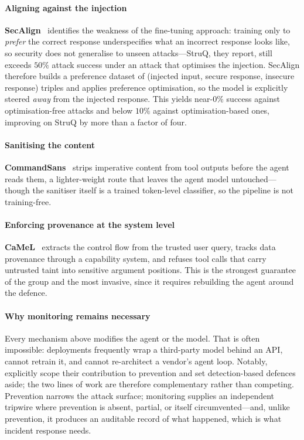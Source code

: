 \documentclass[preprint,12pt,authoryear]{elsarticle}
\theoremstyle{definition}
\begin{document}
\paragraph{Aligning against the injection}
\textbf{SecAlign}~\citep{chen2025secalign} identifies the weakness of the
fine-tuning approach: training only to \emph{prefer} the correct response
underspecifies what an incorrect response looks like, so security does not
generalise to unseen attacks---StruQ, they report, still exceeds $50\%$ attack
success under an attack that optimises the injection. SecAlign therefore builds a
preference dataset of (injected input, secure response, insecure response) triples
and applies preference optimisation, so the model is explicitly steered
\emph{away} from the injected response. This yields near-$0\%$ success against
optimisation-free attacks and below $10\%$ against optimisation-based ones,
improving on StruQ by more than a factor of four.

\paragraph{Sanitising the content}
\textbf{CommandSans}~\citep{das2025commandsans} strips imperative content from
tool outputs before the agent reads them, a lighter-weight route that leaves the
agent model untouched---though the sanitiser itself is a trained token-level
classifier, so the pipeline is not training-free.

\paragraph{Enforcing provenance at the system level}
\textbf{CaMeL}~\citep{debenedetti2025camel} extracts the control flow from the
trusted user query, tracks data provenance through a capability system, and
refuses tool calls that carry untrusted taint into sensitive argument positions.
This is the strongest guarantee of the group and the most invasive, since it
requires rebuilding the agent around the defence.

\paragraph{Why monitoring remains necessary}
Every mechanism above modifies the agent or the model. That is often impossible:
deployments frequently wrap a third-party model behind an API, cannot retrain it,
and cannot re-architect a vendor's agent loop. Notably, \citet{chen2025secalign}
explicitly scope their contribution to prevention and set detection-based defences
aside; the two lines of work are therefore complementary rather than competing.
Prevention narrows the attack surface; monitoring supplies an independent tripwire
where prevention is absent, partial, or itself circumvented---and, unlike
prevention, it produces an auditable record of what happened, which is what
incident response needs.
\end{document}
